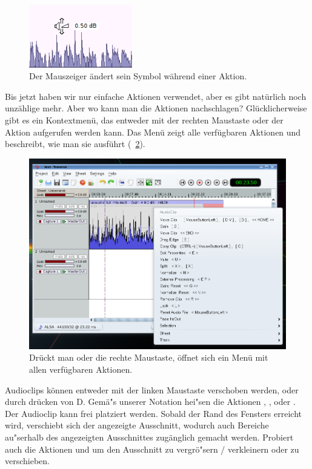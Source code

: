 \begin{figure}
 \centering\includegraphics[width=0.4\textwidth]{../images/gain-cursor.png}
 \caption{Der Mauszeiger ändert sein Symbol während einer  Aktion.}
 \label{fig_gaincursor}
\end{figure}

Bis jetzt haben wir nur einfache Aktionen verwendet, aber es gibt natürlich noch unzählige mehr. Aber wo kann man die Aktionen nachschlagen? Glücklicherweise gibt es ein Kontextmenü, das entweder mit der rechten Maustaste oder der Aktion   aufgerufen werden kann. Das Menü zeigt alle verfügbaren Aktionen und beschreibt, wie man sie ausführt (\FigB\ \ref{fig_clipmenu}).

\begin{figure}
 \centering\includegraphics[width=\textwidth]{../images/clipmenu.png}
 \caption{Drückt man  oder die rechte Maustaste, öffnet sich ein Menü mit allen verfügbaren Aktionen.}
 \label{fig_clipmenu}
\end{figure}

Audioclips können entweder mit der linken Maustaste verschoben werden, oder durch drücken von D. Gemä"s unserer Notation hei"sen die Aktionen , , oder . Der Audioclip kann frei platziert werden. Sobald der Rand des Fensters erreicht wird, verschiebt sich der angezeigte Ausschnitt, wodurch auch Bereiche au"serhalb des angezeigten Ausschnittes zugänglich gemacht werden. Probiert auch die Aktionen  und  um den Ausschnitt zu vergrö"sern / verkleinern oder zu verschieben.

